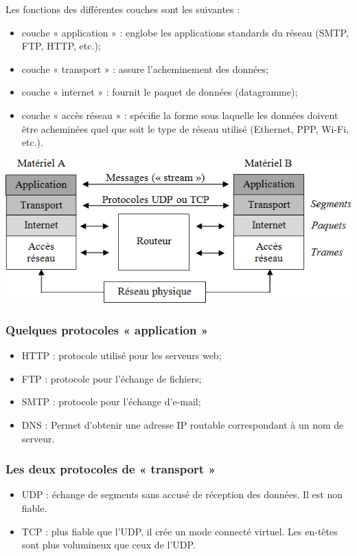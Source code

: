 \documentclass[10pt]{article}
\begin{document}
Les fonctions des différentes couches sont les suivantes : 
\begin{itemize}
\item couche « application » : englobe les applications standards du réseau (SMTP, FTP, HTTP, etc.);
\item couche « transport » : assure l'acheminement des données;
\item couche « internet » : fournit le paquet de données (datagramme);
\item couche « accès réseau » : spécifie la forme sous laquelle les données doivent être acheminées quel que soit le type de réseau utilisé (Ethernet, PPP, Wi-Fi, etc.).
\end{itemize}

\begin{center}
\includegraphics[width=.75\textwidth]{images/fig_15}
\end{center}

\subsubsection*{Quelques protocoles « application »}
\begin{itemize}
\item HTTP : protocole utilisé pour les serveurs web;
\item FTP : protocole pour l’échange de fichiers;
\item SMTP : protocole pour l’échange d’e-mail;
\item DNS : Permet d’obtenir une adresse IP routable correspondant à un nom de serveur.
\end{itemize}

\subsubsection*{Les deux protocoles de « transport »}
\begin{itemize}
\item UDP : échange de segments sans accusé de réception des données. Il est non fiable.
\item TCP : plus fiable que l’UDP, il crée un mode connecté virtuel. Les en-têtes sont plus volumineux que ceux de l’UDP.
\end{itemize}
\end{document}
